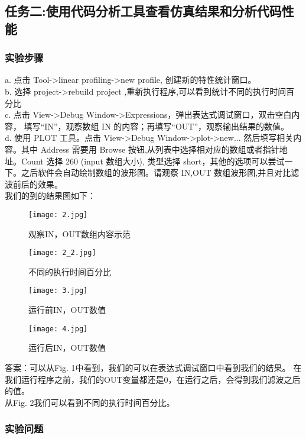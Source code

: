 \documentclass{article}
\begin{document}
\begin{CJK}{UTF8}{gbsn}
\subsection{任务二:使用代码分析工具查看仿真结果和分析代码性能}
\subsubsection{实验步骤} 
a. 点击 Tool->linear profiling->new profile, 创建新的特性统计窗口。\\
b. 选择 project->rebuild project ,重新执行程序,可以看到统计不同的执行时间百分比\\
c. 点击 View->Debug Window->Expressions，弹出表达式调试窗口，双击空白内容，
填写“IN”，观察数组 IN 的内容；再填写“OUT”，观察输出结果的数值。\\
d. 使用 PLOT 工具。点击 View->Debug Window->plot->new... 然后填写相关内容。其中 Address
需要用 Browse 按钮,从列表中选择相对应的数组或者指针地址。Count 选择 260 (input 数组大小),
类型选择 short，其他的选项可以尝试一下。之后软件会自动绘制数组的波形图。请观察 IN,OUT 数组波形图,并且对比滤波前后的效果。\\
我们的到的结果图如下：
\begin{figure}[th]
\begin{minipage}[t]{0.5\linewidth}
\centering
\texttt{[image: 2.jpg]}
\caption{观察IN，OUT数组内容示范}
\end{minipage}%
\begin{minipage}[t]{0.5\linewidth}
\centering
\texttt{[image: 2\_2.jpg]}
\caption{不同的执行时间百分比}
\end{minipage}
\end{figure}
\begin{figure}[h]
\begin{minipage}[t]{0.5\linewidth}
\centering
\texttt{[image: 3.jpg]}
\caption{运行前IN，OUT数值}
\end{minipage}%
\begin{minipage}[t]{0.5\linewidth}
\centering
\texttt{[image: 4.jpg]}
\caption{运行后IN，OUT数值}
\end{minipage}
\end{figure}
答案：可以从Fig. 1中看到，我们的可以在表达式调试窗口中看到我们的结果。
在我们运行程序之前，我们的OUT变量都还是0，在运行之后，会得到我们滤波之后的值。\\
从Fig. 2我们可以看到不同的执行时间百分比。
\subsubsection{实验问题}

\end{CJK}
\end{document}
